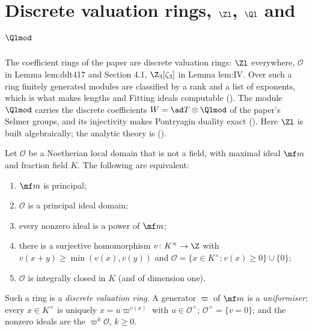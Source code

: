 \section[Discrete valuation rings and \texorpdfstring{$\Zl$}{Zl}]{Discrete valuation rings, \texorpdfstring{$\Zl$}{Zl}, \texorpdfstring{$\Ql$}{Ql} and \texorpdfstring{$\Qlmod$}{Ql/Zl}}\label{sec:modules:dvr}

The coefficient rings of the paper are discrete valuation rings: $\Zl$ everywhere, $\mathcal O$ in Lemma lem:ddt417 and Section 4.1,
$\Z_3[\zeta_3]$ in Lemma lem:IV. Over such a ring finitely generated modules are classified by a rank and a list of exponents, which is
what makes lengths and Fitting ideals computable (). The module $\Qlmod$ carries the discrete coefficients
$W=\ad T\otimes\Qlmod$ of the paper's Selmer groups, and its injectivity makes Pontryagin duality exact ().
Here $\Zl$ is built algebraically; the analytic theory is  ().

\begin{theorem}\label{thm:modules:dvr}
Let $\mathcal O$ be a Noetherian local domain that is not a field, with maximal ideal $\mf m$ and fraction field $K$. The following are equivalent:
\begin{enumerate}[label=(\alph*)]
\item $\mf m$ is principal;
\item $\mathcal O$ is a principal ideal domain;
\item every nonzero ideal is a power of $\mf m$;
\item there is a surjective homomorphism $v\colon K^\times\to\Z$ with $v(x+y)\ge\min(v(x),v(y))$ and $\mathcal O=\{x\in K^\times:v(x)\ge0\}\cup\{0\}$;
\item $\mathcal O$ is integrally closed in $K$ (and of dimension one).
\end{enumerate}
Such a ring is a \emph{discrete valuation ring}. A generator $\varpi$ of $\mf m$ is a \emph{uniformiser}; every $x\in K^\times$ is uniquely
$x=u\varpi^{v(x)}$ with $u\in\mathcal O^\times$; $\mathcal O^\times=\{v=0\}$; and the nonzero ideals are the $\varpi^k\mathcal O$, $k\ge0$.
\end{theorem}

